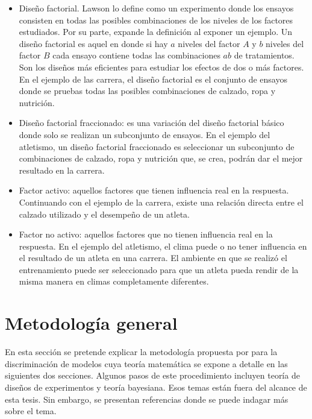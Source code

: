 \begin{itemize}
	\item Diseño factorial. Lawson lo define como un experimento donde los ensayos consisten en todas las posibles combinaciones de los niveles de los factores estudiados. Por su parte, \cite{montgomery2017design} expande la definición al exponer un ejemplo. Un diseño factorial es aquel en donde si hay $a$ niveles del factor $A$ y $b$ niveles del factor $B$ cada ensayo contiene todas las combinaciones $ab$ de tratamientos. Son los diseños más eficientes para estudiar los efectos de dos o más factores. En el ejemplo de las carrera, el diseño factorial es el conjunto de ensayos donde se pruebas todas las posibles combinaciones de calzado, ropa y nutrición. 
	
	\item Diseño factorial fraccionado: es una variación del diseño factorial básico donde solo se realizan un subconjunto de ensayos. En el ejemplo del atletismo, un diseño factorial fraccionado es seleccionar un subconjunto de combinaciones de calzado, ropa y nutrición que, se crea, podrán dar el mejor resultado en la carrera. 
	
	\item Factor activo: aquellos factores que tienen influencia real en la respuesta. Continuando con el ejemplo de la carrera, existe una relación directa entre el calzado utilizado y el desempeño de un atleta. 
	
	\item Factor no activo: aquellos factores que no tienen influencia real en la respuesta. En el ejemplo del atletismo, el clima puede o no tener influencia en el resultado de un atleta en una carrera. El ambiente en que se realizó el entrenamiento puede ser seleccionado para que un atleta pueda rendir de la misma manera en climas completamente diferentes. 
	
\end{itemize}


\section{Metodología general} \label{sec_metodologia}

En esta sección se pretende explicar la metodología propuesta por \cite{meyer1996} para la discriminación de modelos cuya teoría matemática se expone a detalle en las siguientes dos secciones. Algunos pasos de este procedimiento incluyen teoría de diseños de experimentos y teoría bayesiana. Esos temas están fuera del alcance de esta tesis. Sin embargo, se presentan referencias donde se puede indagar más sobre el tema. 

